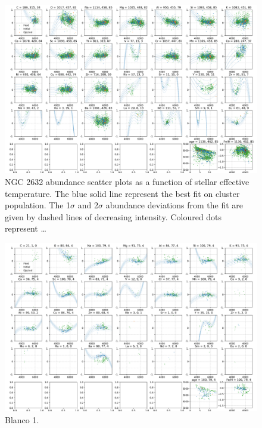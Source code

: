 \begin{figure}
	\centering
	\includegraphics[width=\textwidth]{p_teff_abundances_NGC_2682_orbits_DR3_flag0.png}
	\caption{NGC 2632 abundance scatter plots as a function of stellar effective temperature. The blue solid line represent the best fit on cluster population. The 1$\sigma$ and 2$\sigma$ abundance deviations from the fit are given by dashed lines of decreasing intensity. Coloured dots represent \ldots}
	\label{fig:ct_cluster1}
\end{figure}

\begin{figure}
	\centering
	\includegraphics[width=\textwidth]{p_teff_abundances_Blanco_1_orbits_DR3_flag0.png}
	\caption{Blanco 1.}
	\label{fig:ct_cluster2}
\end{figure}

